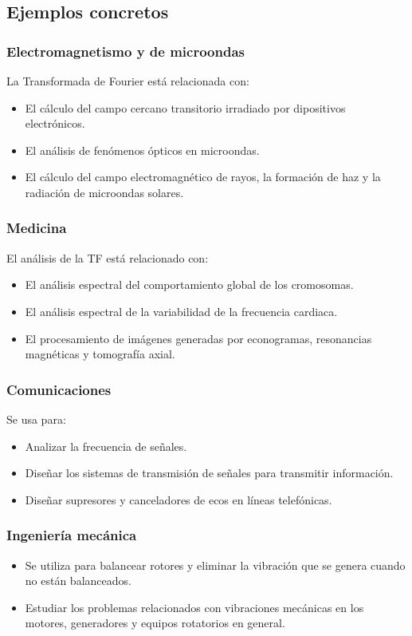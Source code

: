 \subsection{Ejemplos concretos}
\begin{frame}
\frametitle{Electromagnetismo y de microondas}
La Transformada de Fourier está relacionada con:
\begin{itemize}[<+->]
\item El cálculo del campo cercano transitorio irradiado por dipositivos electrónicos.
\item El análisis de fenómenos ópticos en microondas.
\item El cálculo del campo electromagnético de rayos, la formación de haz y la radiación de microondas solares.
\end{itemize}
\end{frame}
\begin{frame}
\frametitle{Medicina}
El análisis de la TF está relacionado con:
\begin{itemize}[<+->]
\item El análisis espectral del comportamiento global de los cromosomas.
\item El análisis espectral de la variabilidad de la frecuencia cardiaca.
\item El procesamiento de imágenes generadas por econogramas, resonancias magnéticas y tomografía axial.
\end{itemize}
\end{frame}
\begin{frame}
\frametitle{Comunicaciones}
Se usa para:
\begin{itemize}[<+->]
\item Analizar la frecuencia de señales.
\item Diseñar los sistemas de transmisión de señales para transmitir información.
\item Diseñar supresores y canceladores de ecos en líneas telefónicas.
\end{itemize}
\end{frame}
\begin{frame}
\frametitle{Ingeniería mecánica}
\begin{itemize}[<+->]
\item  Se utiliza para balancear rotores y eliminar la vibración que se genera cuando no están balanceados.
\item Estudiar los problemas relacionados con vibraciones mecánicas en los motores, generadores y equipos rotatorios en general.
\end{itemize}
\end{frame}
